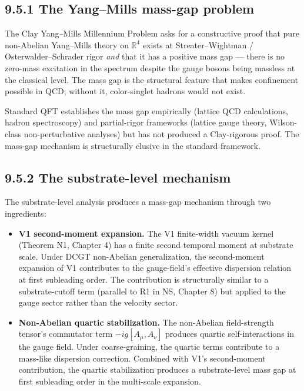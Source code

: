 \documentclass[11pt]{book}
\begin{document}
\subsection{9.5.1 The Yang–Mills mass-gap problem}

The Clay Yang–Mills Millennium Problem asks for a constructive proof that pure non-Abelian Yang–Mills theory on $\mathbb{R}^4$ exists at Streater–Wightman / Osterwalder–Schrader rigor \textit{and} that it has a positive mass gap — there is no zero-mass excitation in the spectrum despite the gauge bosons being massless at the classical level. The mass gap is the structural feature that makes confinement possible in QCD; without it, color-singlet hadrons would not exist.

Standard QFT establishes the mass gap empirically (lattice QCD calculations, hadron spectroscopy) and partial-rigor frameworks (lattice gauge theory, Wilson-class non-perturbative analyses) but has not produced a Clay-rigorous proof. The mass-gap mechanism is structurally elusive in the standard framework.

\subsection{9.5.2 The substrate-level mechanism}

The substrate-level analysis produces a mass-gap mechanism through two ingredients:

\begin{itemize}
\item \textbf{V1 second-moment expansion.} The V1 finite-width vacuum kernel (Theorem N1, Chapter 4) has a finite second temporal moment at substrate scale. Under DCGT non-Abelian generalization, the second-moment expansion of V1 contributes to the gauge-field's effective dispersion relation at first subleading order. The contribution is structurally similar to a substrate-cutoff term (parallel to R1 in NS, Chapter 8) but applied to the gauge sector rather than the velocity sector.
\item \textbf{Non-Abelian quartic stabilization.} The non-Abelian field-strength tensor's commutator term $-ig[A_\mu, A_\nu]$ produces quartic self-interactions in the gauge field. Under coarse-graining, the quartic terms contribute to a mass-like dispersion correction. Combined with V1's second-moment contribution, the quartic stabilization produces a substrate-level mass gap at first subleading order in the multi-scale expansion.
\end{itemize}
\end{document}
